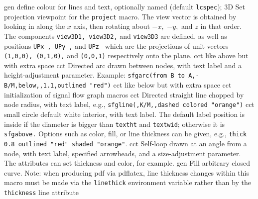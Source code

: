 %
  {gen}%
  {define colour for lines and text, optionally named (default
   {\tt lcspec}); }%
%
  {3D} {Set projection viewpoint for the {\tt project} macro.
   The view vector is obtained by looking in along the $x$ axis,
   then rotating about $-x,$ $-y,$ and $z$ in that order.  The components
   {\tt view3D1, view3D2,} and {\tt view3D3} are defined, as well as
   positions {\tt UPx\_, UPy\_,} and {\tt UPz\_} which are the projections
   of unit vectors {\tt (1,0,0), (0,1,0),} and {\tt (0,0,1)} respectively
   onto the plane.}%
%
  {cct}%
  {like above but with extra space}%
%
  {cct}%
  {Directed arc drawn between nodes, with text label
    and a height-adjustment parameter. Example:
    {\tt sfgarc(from B to A,-B/M,below,{,}1.1,outlined "red")} }%
%
  {cct}%
  {like below but with extra space}%
  {cct}%
  {initialization of signal flow graph macros}%
%
  {cct}%
  {Directed straight line chopped by node radius, with text label,
   e.g., {\tt sfgline(,K/M,{,}dashed colored "orange")} }%
%
  {cct}%
  {small circle default white interior, with text label. The default
  label position is inside if the diameter is bigger than {\tt textht}
  and {\tt textwid}; otherwise it is {\tt sfgabove.} Options such as
  color, fill, or line thickness can be given, e.g.,
  {\tt thick 0.8 outlined "red" shaded "orange"}. }%
%
  {cct}%
  {Self-loop drawn at an angle from a node,
     with text label, specified arrowheads, and a size-adjustment parameter.
     The attributes can set thickness and color, for example. }%
%
  {gen}%
  {Fill arbitrary closed curve. Note: when producing pdf via pdflatex, line
   thickness changes within this macro must be made via the {\tt linethick}
   environment variable rather than by the {\tt thickness} line attribute}%
